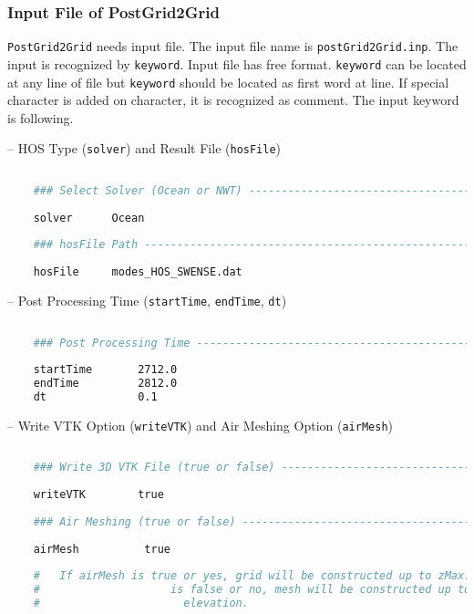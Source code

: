 	\pagebreak
	\subsubsection{Input File of PostGrid2Grid}
	
	\texttt{PostGrid2Grid} needs input file. The input file name is \texttt{postGrid2Grid.inp}. The input is recognized by \texttt{keyword}. Input file has free format. \texttt{keyword} can be located at any line of file but \texttt{keyword} should be located as first word at line. If special character is added on character, it is recognized as comment. The input keyword is following. 
	
	\vspace{0.5cm}
	-- HOS Type (\texttt{solver}) and Result File (\texttt{hosFile})
	
	\begin{lstlisting}[language=bash]
	
	### Select Solver (Ocean or NWT) ----------------------------------- #
	
	solver		Ocean
	
	### hosFile Path --------------------------------------------------- #
	
	hosFile 	modes_HOS_SWENSE.dat
	\end{lstlisting}
	
	-- Post Processing Time (\texttt{startTime}, \texttt{endTime}, \texttt{dt})
		
	\begin{lstlisting}[language=bash]
	
	### Post Processing Time ------------------------------------------- #
	
	startTime		2712.0
	endTime			2812.0
	dt	     		0.1	
	\end{lstlisting}
	
	-- Write VTK Option (\texttt{writeVTK}) and Air Meshing Option  (\texttt{airMesh})
	
	\begin{lstlisting}[language=bash]
	
	### Write 3D VTK File (true or false) ------------------------------ #
	
	writeVTK		true	
	
	### Air Meshing (true or false) ------------------------------------ #
	
	airMesh			 true
	
	#	If airMesh is true or yes, grid will be constructed up to zMax.
	#				     is false or no, mesh will be constructed up to wave 
	#					   elevation.
	\end{lstlisting}
	
